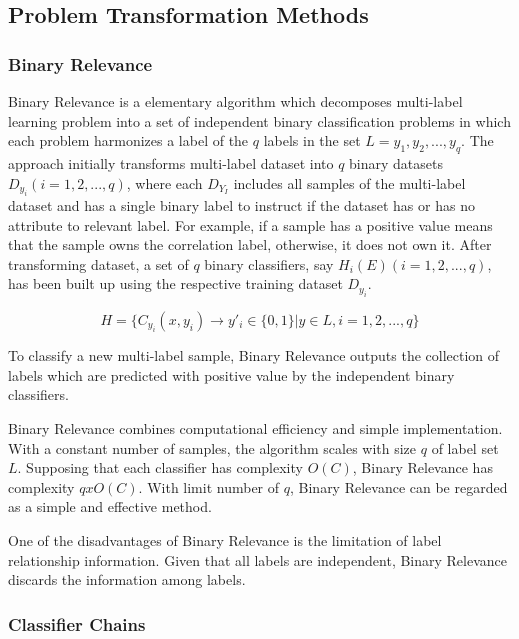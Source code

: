\subsection{Problem Transformation Methods}

\subsubsection{Binary Relevance}

Binary Relevance is a elementary algorithm which decomposes multi-label learning problem into a set of independent binary classification problems in which each problem harmonizes a label of the $q$ labels in the set $L = {y_{1}, y_{2},...,y_{q}}$. The approach initially transforms multi-label dataset into $q$ binary datasets $D_{y_{i}} (i = 1,2,...,q)$, where each $D_{Y_{I}}$ includes all samples of the multi-label dataset and has a single binary label to instruct if the dataset has or has no attribute to relevant label. For example, if a sample has a positive value means that the sample owns the correlation label, otherwise, it does not own it. After transforming dataset, a set of $q$ binary classifiers, say $H_{i}(E) (i = 1,2,...,q)$, has been built up using the respective training dataset $D_{y_{i}}$. 

\begin{equation}\label{eq:BinaryRelevance}
H = \{C_{y_{i}}(x, y_{i}) \to y'_{i} \in \{0,1\}| y \in L, i = 1,2,...,q\}
\end{equation}

To classify a new multi-label sample, Binary Relevance outputs the collection of labels which are predicted with positive value by the independent binary classifiers.

Binary Relevance combines computational efficiency and simple implementation. With a constant number of samples, the algorithm scales with size $q$ of label set $L$. Supposing that each classifier has complexity $O(C)$, Binary Relevance has complexity $qxO(C)$. With limit number of $q$, Binary Relevance can be regarded as a simple and effective method.

One of the disadvantages of Binary Relevance is the limitation of label relationship information. Given that all labels are independent, Binary Relevance discards the information among labels.

\subsubsection{Classifier Chains}

